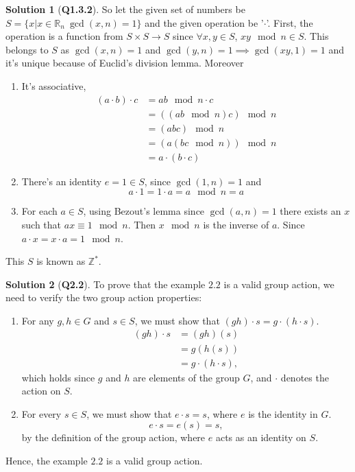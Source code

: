 \documentclass{article}
\theoremstyle{definition}
\newtheorem*{sol}{Solution}
\begin{document}
\begin{sol}[\textbf{Q1.3.2}]
	So let the given set of numbers be $S=\{x |x\in \mathbb{R}_n \  \gcd(x,n) = 1\}$ and the given operation be '$\cdot$'. First, the operation is a function from $S\times S\rightarrow S$ since $\forall x,y \in S$, $xy\mod{n} \in S$. This belongs to $S$ as $\gcd(x,n)=1$ and $\gcd(y,n)=1 \implies \gcd(xy,1)=1$ and it's unique because of Euclid's division lemma. Moreover
	\begin{enumerate}
		\item It's associative,
		      \begin{align}
			      (a\cdot b)\cdot c & = ab\mod{n} \cdot c     \\
			                        & = ((ab\mod{n})c)\mod{n} \\
			                        & = (abc)\mod{n}          \\
			                        & = (a(bc\mod{n}))\mod{n} \\
			                        & = a\cdot(b\cdot c)
		      \end{align}
		\item There's an identity $e=1\in S$, since $\gcd(1,n)=1$ and
		      \begin{equation}
			      a\cdot 1 = 1 \cdot a = a \mod{n} = a
		      \end{equation}
		\item For each $a\in S$,  using Bezout's lemma since $\gcd(a,n)=1$ there exists an $x$ such that $ax\equiv 1\mod{n}$. Then $x\mod{n}$ is the inverse of $a$. Since $a\cdot x = x\cdot a = 1\mod{n}$.
	\end{enumerate}
	This $S$ is known as $\mathbb{Z}^*$.
\end{sol}

\begin{sol}[\textbf{Q2.2}]
	To prove that the example $2.2$ is a valid group action, we need to verify the two group action properties:
	\begin{enumerate}
		\item For any $g,h \in G$ and $s \in S$, we must show that $(gh)\cdot s = g\cdot(h\cdot s)$.
		      \begin{align}
			      (gh)\cdot s & = (gh)(s)           \\
			                  & = g(h(s))           \\
			                  & = g\cdot(h\cdot s),
		      \end{align}
		      which holds since $g$ and $h$ are elements of the group $G$, and $\cdot$ denotes the action on $S$.
		\item For every $s \in S$, we must show that $e\cdot s = s$, where $e$ is the identity in $G$.
		      \begin{equation}
			      e\cdot s = e(s) = s,
		      \end{equation}
		      by the definition of the group action, where $e$ acts as an identity on $S$.
	\end{enumerate}
	Hence, the example $2.2$ is a valid group action.
\end{sol}
\end{document}
